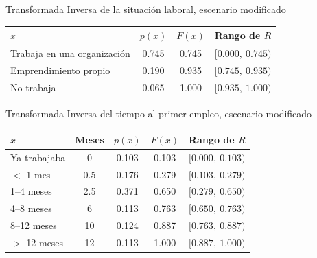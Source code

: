 \begin{mitabla}{Transformada Inversa de la situación laboral, escenario modificado \datosprueba}
\begin{tabular}{lccc}
\toprule
$x$ & $p(x)$ & $F(x)$ & Rango de $R$ \\
\midrule
Trabaja en una organización & 0.745 & 0.745 & $[0.000,\ 0.745)$ \\
Emprendimiento propio & 0.190 & 0.935 & $[0.745,\ 0.935)$ \\
No trabaja & 0.065 & 1.000 & $[0.935,\ 1.000)$ \\
\bottomrule
\end{tabular}
\end{mitabla}

\begin{mitabla}{Transformada Inversa del tiempo al primer empleo, escenario modificado \datosprueba}
\begin{tabular}{lcccc}
\toprule
$x$ & Meses & $p(x)$ & $F(x)$ & Rango de $R$ \\
\midrule
Ya trabajaba & 0 & 0.103 & 0.103 & $[0.000,\ 0.103)$ \\
$<$ 1 mes & 0.5 & 0.176 & 0.279 & $[0.103,\ 0.279)$ \\
1–4 meses & 2.5 & 0.371 & 0.650 & $[0.279,\ 0.650)$ \\
4–8 meses & 6 & 0.113 & 0.763 & $[0.650,\ 0.763)$ \\
8–12 meses & 10 & 0.124 & 0.887 & $[0.763,\ 0.887)$ \\
$>$ 12 meses & 12 & 0.113 & 1.000 & $[0.887,\ 1.000)$ \\
\bottomrule
\end{tabular}
\end{mitabla}

